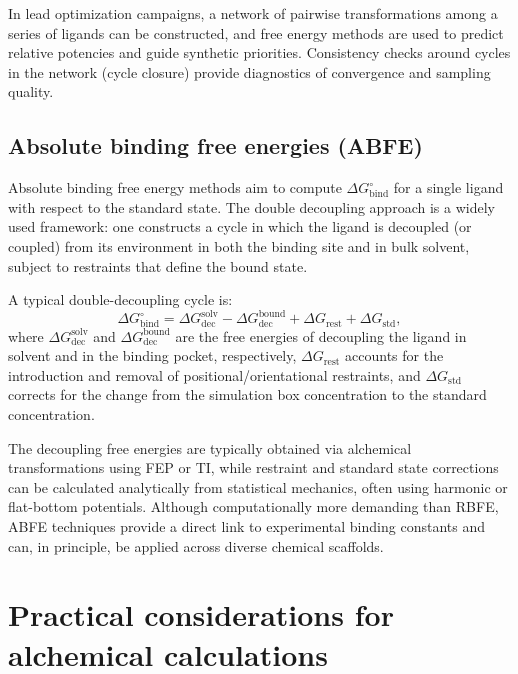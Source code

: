\documentclass[12pt]{article}
\begin{document}
In lead optimization campaigns, a network of pairwise transformations among a series of ligands can be constructed, and free energy methods are used to predict relative potencies and guide synthetic priorities.\cite{CH10_wang2015accurate,CH10_aldeghi2018accurate} 
Consistency checks around cycles in the network (cycle closure) provide diagnostics of convergence and sampling quality. 

\subsection{Absolute binding free energies (ABFE)}

Absolute binding free energy methods aim to compute \(\Delta G^\circ_\mathrm{bind}\) for a single ligand with respect to the standard state. 
The double decoupling approach is a widely used framework: one constructs a cycle in which the ligand is decoupled (or coupled) from its environment in both the binding site and in bulk solvent, subject to restraints that define the bound state.\cite{CH10_gilson1997calculation,CH10_deng2009abfe} 

A typical double-decoupling cycle is:
\[
\Delta G^\circ_\mathrm{bind}
= \Delta G_\mathrm{dec}^{\mathrm{solv}} 
- \Delta G_\mathrm{dec}^{\mathrm{bound}}
+ \Delta G_\mathrm{rest}
+ \Delta G_\mathrm{std},
\]
where \(\Delta G_\mathrm{dec}^{\mathrm{solv}}\) and \(\Delta G_\mathrm{dec}^{\mathrm{bound}}\) are the free energies of decoupling the ligand in solvent and in the binding pocket, respectively, \(\Delta G_\mathrm{rest}\) accounts for the introduction and removal of positional/orientational restraints, and \(\Delta G_\mathrm{std}\) corrects for the change from the simulation box concentration to the standard concentration. 

The decoupling free energies are typically obtained via alchemical transformations using FEP or TI, while restraint and standard state corrections can be calculated analytically from statistical mechanics, often using harmonic or flat-bottom potentials.\cite{CH10_gilson1997calculation,CH10_deng2009abfe,CH10_choderamobley2011perspective} 
Although computationally more demanding than RBFE, ABFE techniques provide a direct link to experimental binding constants and can, in principle, be applied across diverse chemical scaffolds. 

\section{Practical considerations for alchemical calculations}
\end{document}
